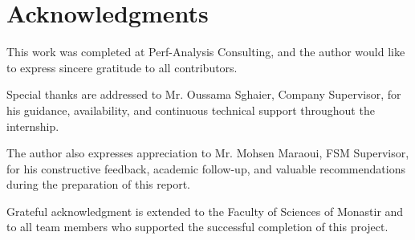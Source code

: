 \section*{Acknowledgments}

This work was completed at Perf-Analysis Consulting, and the author would like
to express sincere gratitude to all contributors.

Special thanks are addressed to Mr. Oussama Sghaier, Company Supervisor, for
his guidance, availability, and continuous technical support throughout the
internship.

The author also expresses appreciation to Mr. Mohsen Maraoui, FSM Supervisor,
for his constructive feedback, academic follow-up, and valuable recommendations
during the preparation of this report.

Grateful acknowledgment is extended to the Faculty of Sciences of Monastir and
to all team members who supported the successful completion of this project.

